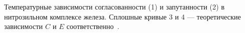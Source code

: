 Температурные зависимости согласованности (1) и запутанности (2) в нитрозильном комплексе железа.
Сплошные кривые 3 и 4 --- теоретические зависимости $C$ и $E$ соответственно~\cite{Aldoshin2008}.
